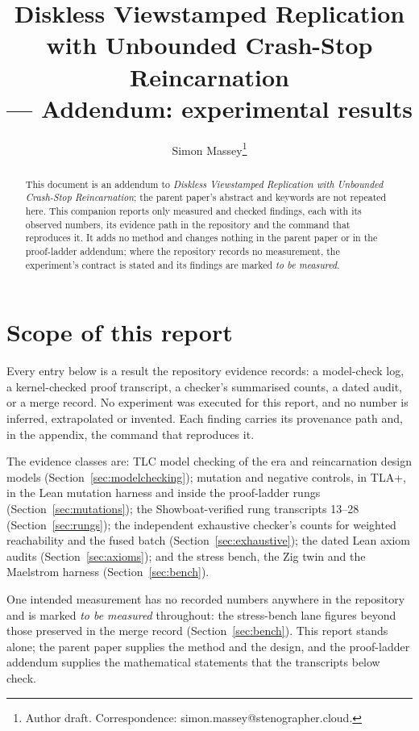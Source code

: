 \documentclass[10pt,journal,letterpaper]{IEEEtran}
\title{Diskless Viewstamped Replication with Unbounded Crash-Stop Reincarnation\\--- Addendum: experimental results}
\author{Simon Massey\thanks{Author draft. Correspondence: simon.massey@stenographer.cloud.}}
\newcommand{\tobemeasured}{\emph{to be measured}}
\begin{document}
\maketitle
\thispagestyle{fancy}

\begin{abstract}
This document is an addendum to \emph{Diskless Viewstamped Replication with
Unbounded Crash-Stop Reincarnation}; the parent paper's abstract and keywords
are not repeated here. This companion reports only measured and checked
findings, each with its observed numbers, its evidence path in the repository
and the command that reproduces it. It adds no method and changes nothing in
the parent paper or in the proof-ladder addendum; where the repository records
no measurement, the experiment's contract is stated and its findings are
marked \tobemeasured.
\end{abstract}

\section{Scope of this report}
Every entry below is a result the repository evidence records: a model-check
log, a kernel-checked proof transcript, a checker's summarised counts, a dated
audit, or a merge record. No experiment was executed for this report, and no
number is inferred, extrapolated or invented. Each finding carries its
provenance path and, in the appendix, the command that reproduces it.

The evidence classes are: TLC model checking of the era and reincarnation
design models (Section~\ref{sec:modelchecking}); mutation and negative
controls, in TLA+, in the Lean mutation harness and inside the proof-ladder
rungs (Section~\ref{sec:mutations}); the Showboat-verified rung transcripts
13--28 (Section~\ref{sec:rungs}); the independent exhaustive checker's counts
for weighted reachability and the fused batch (Section~\ref{sec:exhaustive});
the dated Lean axiom audits (Section~\ref{sec:axioms}); and the stress
bench, the Zig twin and the Maelstrom harness (Section~\ref{sec:bench}).

One intended measurement has no recorded numbers anywhere in the repository
and is marked \tobemeasured{} throughout: the stress-bench lane figures
beyond those preserved in the merge record
(Section~\ref{sec:bench}). This report stands alone; the parent paper
\cite{parent} supplies the method and the design, and the proof-ladder
addendum \cite{ladder} supplies the mathematical statements that the
transcripts below check.
\end{document}
